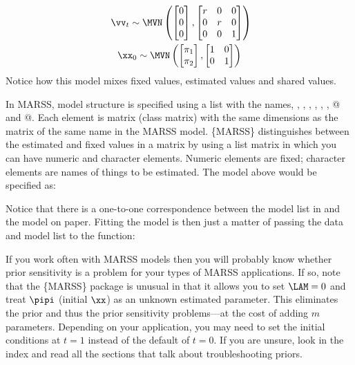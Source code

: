 \begin{gather*}
 \textrm{ } \vv_t \sim \MVN\begin{pmatrix}\begin{bmatrix}0\\0\\0\end{bmatrix},\begin{bmatrix}r&0&0\\0&r&0\\0&0&1\end{bmatrix} \end{pmatrix}  \\
\xx_0 \sim \MVN\begin{pmatrix}\begin{bmatrix}\pi_1\\ \pi_2\end{bmatrix},\begin{bmatrix}1&0\\0&1\end{bmatrix} \end{pmatrix} 
\end{gather*}
Notice how this model mixes fixed values, estimated values and shared values.

In MARSS, model structure is specified using a list with the names, \verb@Z@, \verb@A@, \verb@R@, \verb@B@, \verb@U@, \verb@Q@, @ and @.  Each element is matrix (class matrix) with the same dimensions as the matrix of the same name in the MARSS model.  \{MARSS\} distinguishes between the estimated and fixed values in a matrix by using a list matrix in which you can have numeric and character elements.  Numeric elements are fixed; character elements are names of things to be estimated.  The model above would be specified as:

Notice that there is a one-to-one correspondence between the model list in \R and the model on paper.  Fitting the model is then just a matter of passing the data and model list to the \verb@MARSS@ function:


If you work often with MARSS models then you will probably know whether prior sensitivity is a problem for your types of MARSS applications.  If so, note that the \{MARSS\} package is unusual in that it allows you to set $\LAM=0$ and treat $\pipi$ (initial $\xx$) as an unknown estimated parameter.  This eliminates the prior and thus the prior sensitivity problems---at the cost of adding $m$ parameters.  Depending on your application, you may need to set the initial conditions at $t=1$ instead of the default of $t=0$.  If you are unsure, look in the index and read all the sections that talk about troubleshooting priors.

